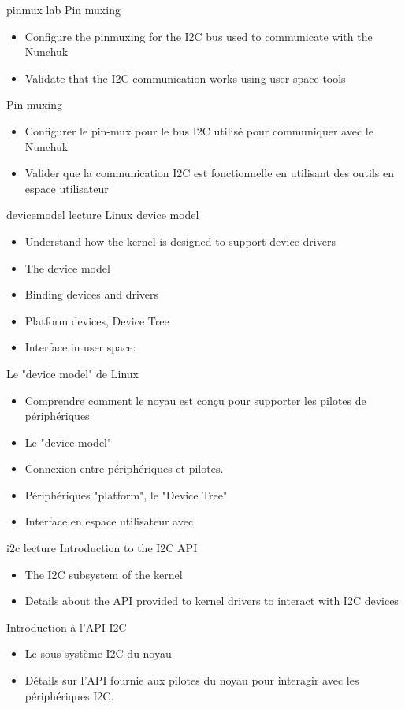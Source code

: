 {pinmux}
{lab}
{Pin muxing}
{
  \begin{itemize}
  \item Configure the pinmuxing for the I2C bus used to communicate
    with the Nunchuk
  \item Validate that the I2C communication works using user space
    tools
  \end{itemize}
}
{Pin-muxing}
{
  \begin{itemize}
  \item Configurer le pin-mux pour le bus I2C utilisé pour communiquer
    avec le Nunchuk
  \item Valider que la communication I2C est fonctionnelle en
    utilisant des outils en espace utilisateur
  \end{itemize}
}
{devicemodel}
{lecture}
{Linux device model}
{
  \begin{itemize}
  \item Understand how the kernel is designed to support device
    drivers
  \item The device model
  \item Binding devices and drivers
  \item Platform devices, Device Tree
  \item Interface in user space: 
  \end{itemize}
}
{Le "device model" de Linux}
{
  \begin{itemize}
  \item Comprendre comment le noyau est conçu pour supporter les pilotes
    de périphériques
  \item Le "device model"
  \item Connexion entre périphériques et pilotes.
  \item Périphériques "platform", le "Device Tree"
  \item Interface en espace utilisateur avec 
  \end{itemize}
}
{i2c}
{lecture}
{Introduction to the I2C API}
{
  \begin{itemize}
  \item The I2C subsystem of the kernel
  \item Details about the API provided to kernel drivers to interact
    with I2C devices
  \end{itemize}
}
{Introduction à l'API I2C}
{
  \begin{itemize}
  \item Le sous-système I2C du noyau
  \item Détails sur l'API fournie aux pilotes du noyau pour interagir
    avec les périphériques I2C.
  \end{itemize}
}
